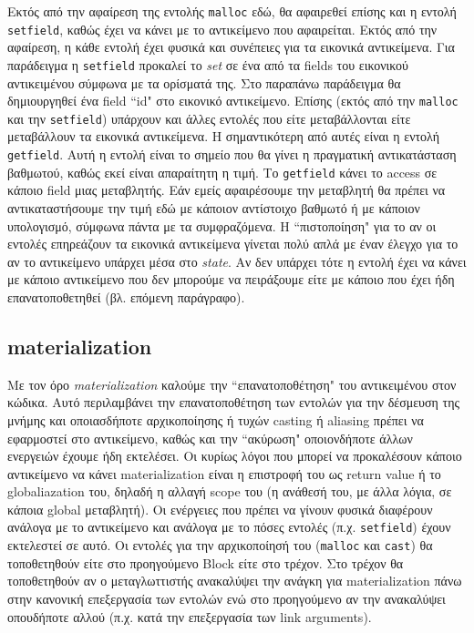 Εκτός από την αφαίρεση της εντολής \texttt{malloc} εδώ, θα αφαιρεθεί επίσης και
η εντολή \texttt{setfield}, καθώς έχει να κάνει με το αντικείμενο που
αφαιρείται. Εκτός από την αφαίρεση, η κάθε εντολή έχει φυσικά και συνέπειες για
τα εικονικά αντικείμενα. Για παράδειγμα η \texttt{setfield} προκαλεί το
\textit{set} σε ένα από τα fields του εικονικού αντικειμένου σύμφωνα με τα
ορίσματά της. Στο παραπάνω παράδειγμα θα δημιουργηθεί ένα field ``id" στο
εικονικό αντικείμενο. Επίσης (εκτός από την \texttt{malloc} και την
\texttt{setfield}) υπάρχουν και άλλες εντολές που είτε μεταβάλλονται είτε
μεταβάλλουν τα εικονικά αντικείμενα. Η σημαντικότερη από αυτές είναι η εντολή
\texttt{getfield}. Αυτή η εντολή είναι το σημείο που θα γίνει η πραγματική
αντικατάσταση βαθμωτού, καθώς εκεί είναι απαραίτητη η τιμή. Το \texttt{getfield}
κάνει το access σε κάποιο field μιας μεταβλητής. Εάν εμείς αφαιρέσουμε την
μεταβλητή θα πρέπει να αντικαταστήσουμε την τιμή εδώ με κάποιον αντίστοιχο
βαθμωτό ή με κάποιον υπολογισμό, σύμφωνα πάντα με τα συμφραζόμενα. Η
``πιστοποίηση" για το αν οι εντολές επηρεάζουν τα εικονικά αντικείμενα γίνεται
πολύ απλά με έναν έλεγχο για το αν το αντικείμενο υπάρχει μέσα στο
\textit{state}. Αν δεν υπάρχει τότε η εντολή έχει να κάνει με κάποιο αντικείμενο
που δεν μπορούμε να πειράξουμε είτε με κάποιο που έχει ήδη επανατοποθετηθεί (βλ.
επόμενη παράγραφο).

\subsection{materialization}

Με τον όρο \textit{materialization} καλούμε την ``επανατοποθέτηση" του
αντικειμένου στον κώδικα. Αυτό περιλαμβάνει την επανατοποθέτηση των εντολών για
την δέσμευση της μνήμης και οποιασδήποτε αρχικοποίησης ή τυχών casting ή
aliasing πρέπει να εφαρμοστεί στο αντικείμενο, καθώς και την ``ακύρωση"
οποιονδήποτε άλλων ενεργειών έχουμε ήδη εκτελέσει. Οι κυρίως λόγοι που μπορεί να
προκαλέσουν κάποιο αντικείμενο να κάνει materialization είναι η επιστροφή του ως
return value ή το globaliazation του, δηλαδή η αλλαγή scope του (η ανάθεσή του,
με άλλα λόγια, σε κάποια global μεταβλητή). Οι ενέργειες που πρέπει να γίνουν
φυσικά διαφέρουν ανάλογα με το αντικείμενο και ανάλογα με το πόσες εντολές (π.χ.
\texttt{setfield}) έχουν εκτελεστεί σε αυτό. Οι εντολές για την αρχικοποίησή του
(\texttt{malloc} και \texttt{cast}) θα τοποθετηθούν είτε στο προηγούμενο Block
είτε στο τρέχον. Στο τρέχον θα τοποθετηθούν αν ο μεταγλωττιστής ανακαλύψει την
ανάγκη για materialization πάνω στην κανονική επεξεργασία των εντολών ενώ στο
προηγούμενο αν την ανακαλύψει οπουδήποτε αλλού (π.χ. κατά την επεξεργασία των
link arguments).

